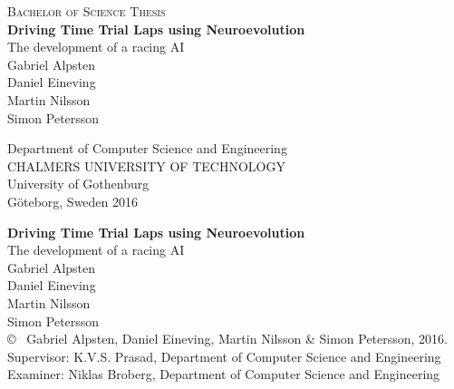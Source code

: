 \newpage
\thispagestyle{empty}
\begin{center}
	\textsc{\large Bachelor of Science Thesis }\\[4cm]		%
	\textbf{\Large Driving Time Trial Laps using Neuroevolution} \\[1cm]
	{\large The development of a racing AI}\\[1cm]
	{\large Gabriel Alpsten}\\
	{\large Daniel Eineving}\\
	{\large Martin Nilsson}\\
	{\large Simon Petersson}
	
	\vfill	

    Department of Computer Science and Engineering\\
    CHALMERS UNIVERSITY OF TECHNOLOGY\\
    University of Gothenburg\\
    
    Göteborg, Sweden 2016\\

\end{center}


\newpage
\thispagestyle{plain}
\noindent
\textbf{Driving Time Trial Laps using Neuroevolution}\\
The development of a racing AI\\
{\large Gabriel Alpsten}\\
{\large Daniel Eineving}\\
{\large Martin Nilsson}\\
{\large Simon Petersson}\\

\noindent
\copyright ~ Gabriel Alpsten, Daniel Eineving, Martin Nilsson \& Simon Petersson, 2016.\\ \setlength{\parskip}{1cm}
\noindent
Supervisor: K.V.S. Prasad, Department of Computer Science and Engineering\\
Examiner: Niklas Broberg, Department of Computer Science and Engineering \\ \setlength{\parskip}{1cm}

